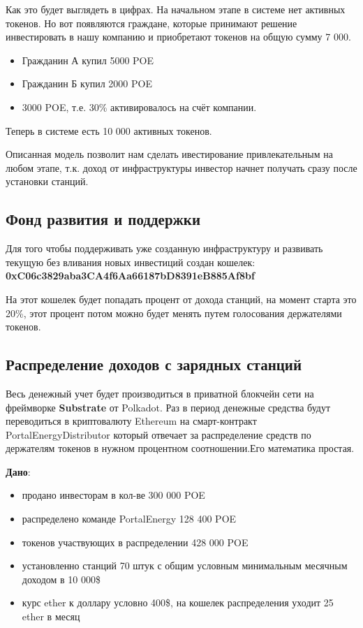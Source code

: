 \documentclass[a4paper,12pt]{report}
\begin{document}
Как это будет выглядеть в цифрах.
На начальном этапе в системе нет активных токенов. Но вот появляются граждане, которые принимают решение инвестировать в нашу компанию и приобретают токенов на общую сумму 7 000. 
\begin{itemize}
	\item Гражданин А купил 5000 POE
	\item Гражданин Б купил 2000 POE
	\item 3000 POE, т.е. 30\% активировалось на счёт компании.
\end{itemize}

Теперь в системе есть 10 000 активных токенов.

Описанная модель позволит нам сделать ивестирование привлекательным на любом этапе, т.к. доход от инфраструктуры инвестор начнет получать сразу после установки станций. 

\subsection{Фонд развития и поддержки}
Для того чтобы поддерживать уже созданную инфраструктуру и развивать текущую без вливания новых инвестиций создан кошелек: 
\textbf{0xC06c3829aba3CA4f6Aa66187bD8391eB885Af8bf}

На этот кошелек будет попадать процент от дохода станций, на момент старта это 20\%, этот процент потом можно будет менять путем голосования держателями токенов. 


\subsection{Распределение доходов с зарядных станций }
\label{capital}
Весь денежный учет будет производиться в приватной блокчейн сети на фреймворке \textbf{Substrate} от Polkadot. 
Раз в период денежные средства будут переводиться в криптовалюту Ethereum на смарт-контракт PortalEnergyDistributor который отвечает за распределение средств по держателям токенов в нужном процентном соотношении.Его математика простая.

\textbf{Дано}:



\begin{itemize}
	\item продано инвесторам в кол-ве 300 000 POE
	\item распределено команде PortalEnergy 128 400 POE
	\item токенов участвующих в распределении 428 000 POE
	\item установленно станций 70 штук с общим условным минимальным месячным доходом в 10 000\$
	\item курс ether к доллару условно 400\$,  на кошелек распределения уходит 25 ether в месяц
\end{itemize}
\end{document}

